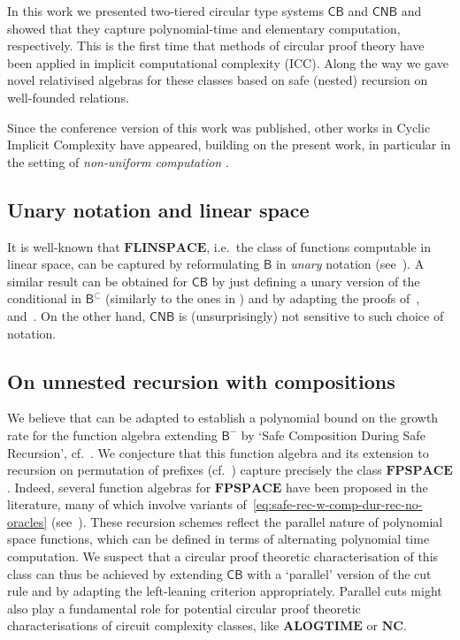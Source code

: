 \documentclass[manuscript,screen]{acmart}
\theoremstyle{definition}
\theoremstyle{remark}
\newcommand{\permpref}{\subset}
\newcommand{\pspace}{\mathbf{PSPACE}}
\newcommand{\f}{\mathbf{F}}
\newcommand{\fpspace}{\f\pspace}
\newcommand{\alogtime}{\mathbf{ALOGTIME}}
\newcommand{\nc}{\mathbf{NC}}
\newcommand{\flinspace}{\mathbf{FLINSPACE}}
\newcommand{\bc}{\mathsf{B}}
\newcommand{\bcwfpo}[1]{\bc^{#1}}
\newcommand{\bcnorec}{\bc^{-}}
\newcommand{\nested}{\mathsf{N}}
\newcommand{\bcpp}{\bcwfpo{\permpref}}
\newcommand{\cyclic}{\mathsf{C}}
\newcommand{\cbc}{\cyclic\bc}
\newcommand{\ncbc}{\cyclic\nested\bc}
\begin{document}
In this work we presented two-tiered circular type systems $\cbc$ and $\ncbc$ and showed that they capture polynomial-time and elementary computation, respectively.
This is the first time that methods of circular proof theory have been applied in implicit computational complexity (ICC).
Along the way we gave novel relativised algebras for these classes based on safe (nested) recursion on well-founded relations.

Since the conference version \cite{CurziDas:lics22} of this work was published, other works in Cyclic Implicit Complexity have appeared, building on the present work, in particular in the setting of \emph{non-uniform computation} \cite{CurziDas:csl23,AcclavioCurziGuerrieri:csl24}.

\subsection{Unary notation and linear space}
It is well-known that  $\flinspace$, i.e.~the class of functions computable in linear space, can be captured  by reformulating $\bc$ in  \emph{unary} notation (see~\cite{bellantoniTESIS}). A similar result can be obtained for  $\cbc$ by just defining a unary version of the conditional in $\bcpp$ (similarly to the ones in \cite{Das2021,Kuperberg-Pous21}) and by adapting the proofs  of~,~  and~.  On the other hand, $\ncbc$ is (unsurprisingly) not sensitive to such choice of notation. 


 \subsection{On unnested recursion with compositions}
  We believe that  can be adapted to establish a polynomial bound on the growth rate  for the function algebra extending $\bcnorec$ by `Safe Composition During Safe Recursion', cf.~. 
  We conjecture that this  function algebra and its extension to recursion on permutation of prefixes (cf.~) capture precisely the class $\fpspace$. 
  Indeed, several function algebras for $\fpspace$ have been proposed in the literature, many of which involve variants of~\eqref{eq:safe-rec-w-comp-dur-rec-no-oracles} (see~\cite{Leivant-pspace,Oitavem-pspace}).
% 
  These recursion schemes reflect the parallel nature of polynomial space functions, which can be defined in terms of alternating polynomial time computation. 
  We suspect that a circular proof theoretic characterisation of this class can thus be achieved by extending $\cbc$ with a `parallel' version of the  cut rule and by adapting the left-leaning criterion appropriately.
Parallel cuts might also play a fundamental role for potential circular proof theoretic characterisations of circuit complexity classes, like $\alogtime$ or $\nc$. 
\end{document}
